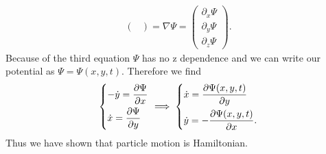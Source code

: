 \begin{ex}
\begin{align}
\begin{pmatrix}
\end{pmatrix}
 = \nabla \Psi =
 \begin{pmatrix}
 	\partial_x \Psi \\ \partial_y \Psi \\ \partial_z \Psi
 \end{pmatrix}.
\end{align}
Because of the third equation $\Psi$ has no z dependence and we can write our potential as $\Psi = \Psi(x, y, t)$. Therefore we find
\begin{align}
	\begin{dcases}
		-\dot{y} = \frac{\partial \Psi}{\partial x} \\
		\dot{x} = \frac{\partial \Psi}{\partial y}
	\end{dcases}
	\implies 
	\begin{dcases}
		\dot{x} = \frac{\partial \Psi(x,y,t)}{\partial y} \\
	\dot{y} = -\frac{\partial \Psi(x,y,t)}{\partial x}.
	\end{dcases}
\end{align}
Thus we have shown that particle motion is Hamiltonian.
\end{ex}

